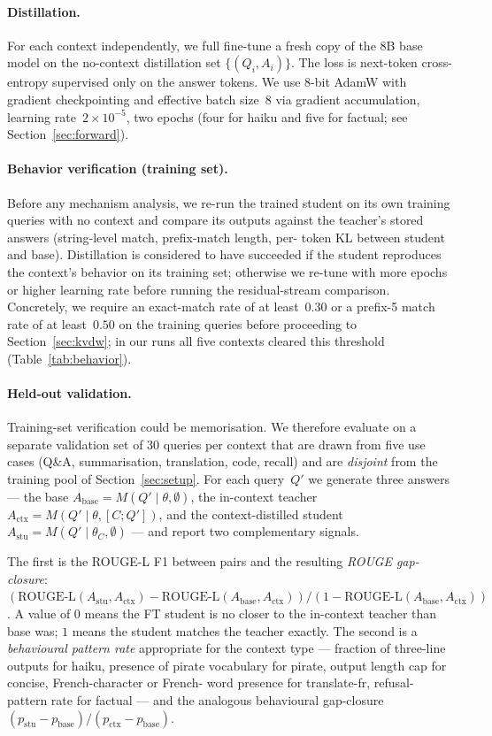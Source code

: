 \documentclass{article}
\begin{document}
\paragraph{Distillation.}
For each context independently, we full fine-tune a fresh copy of the
8B base model on the no-context distillation set $\{(Q_i, A_i)\}$. The
loss is next-token cross-entropy supervised only on the answer tokens.
We use 8-bit AdamW with gradient checkpointing and effective batch
size~$8$ via gradient accumulation, learning rate~$2 \times 10^{-5}$,
two epochs (four for haiku and five for factual; see
Section~\ref{sec:forward}).

\paragraph{Behavior verification (training set).}
Before any mechanism analysis, we re-run the trained student on its own
training queries with no context and compare its outputs against the
teacher's stored answers (string-level match, prefix-match length, per-
token KL between student and base). Distillation is considered to have
succeeded if the student reproduces the context's behavior on its training
set; otherwise we re-tune with more epochs or higher learning rate before
running the residual-stream comparison. Concretely, we require an
exact-match rate of at least~$0.30$ or a prefix-5 match rate of at
least~$0.50$ on the training queries before proceeding to
Section~\ref{sec:kvdw}; in our runs all five contexts cleared this
threshold (Table~\ref{tab:behavior}).

\paragraph{Held-out validation.}
Training-set verification could be memorisation. We therefore evaluate on
a separate validation set of 30 queries per context that are drawn from
five use cases (Q\&A, summarisation, translation, code, recall) and are
\emph{disjoint} from the training pool of Section~\ref{sec:setup}. For
each query~$Q'$ we generate three answers --- the base $A_\text{base} =
M(Q' \mid \theta, \emptyset)$, the in-context teacher $A_\text{ctx} =
M(Q' \mid \theta, [C; Q'])$, and the context-distilled student
$A_\text{stu} = M(Q' \mid \theta_C, \emptyset)$ --- and report two
complementary signals.

The first is the ROUGE-L F1 between pairs and the resulting
\emph{ROUGE gap-closure}: $(\text{ROUGE-L}(A_\text{stu}, A_\text{ctx}) -
\text{ROUGE-L}(A_\text{base}, A_\text{ctx})) / (1 -
\text{ROUGE-L}(A_\text{base}, A_\text{ctx}))$. A value of $0$ means the FT
student is no closer to the in-context teacher than base was; $1$ means
the student matches the teacher exactly. The second is a
\emph{behavioural pattern rate} appropriate for the context type ---
fraction of three-line outputs for haiku, presence of pirate vocabulary
for pirate, output length cap for concise, French-character or French-
word presence for translate-fr, refusal-pattern rate for factual --- and
the analogous behavioural gap-closure $(p_\text{stu} - p_\text{base}) /
(p_\text{ctx} - p_\text{base})$.
\end{document}
